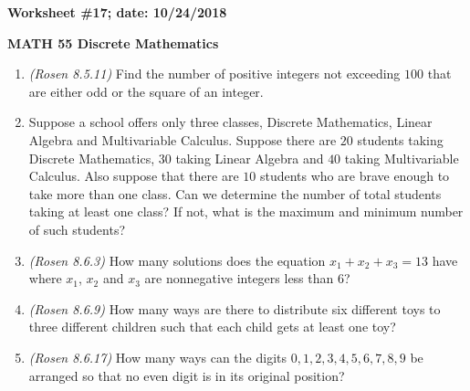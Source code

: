 \documentclass{article}
\begin{document}
{\bf Worksheet \#17; date: 10/24/2018}

{\bf MATH 55 Discrete Mathematics}

\begin{enumerate}
\item {\em (Rosen 8.5.11)} Find the number of positive integers not exceeding $100$ that are either odd or the square of an integer.

\item Suppose a school offers only three classes, Discrete Mathematics, Linear Algebra and Multivariable Calculus. Suppose there are $20$ students taking Discrete Mathematics, $30$ taking Linear Algebra and $40$ taking Multivariable Calculus. Also suppose that there are $10$ students who are brave enough to take more than one class. Can we determine the number of total students taking at least one class? If not, what is the maximum and minimum number of such students?

\item {\em (Rosen 8.6.3)} How many solutions does the equation $x_1 + x_2 + x_3 = 13$ have where $x_1$, $x_2$ and $x_3$ are nonnegative integers less than $6$?

\item {\em (Rosen 8.6.9)} How many ways are there to distribute six different toys to three different children such that each child gets at least one toy?

\item {\em (Rosen 8.6.17)} How many ways can the digits $0, 1, 2, 3, 4, 5, 6, 7, 8, 9$ be arranged so that no even digit is in its original position?
\end{enumerate}
\end{document}
